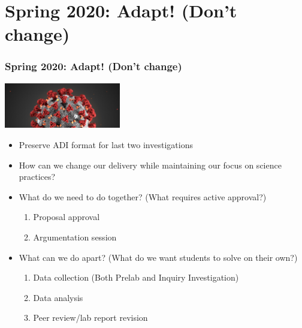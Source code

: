 \documentclass[aspectratio=169,shadow=true]{beamer}
\begin{document}
{\begin{frame}
\begin{center}
  \end{center}
\end{frame}
}

\section{Spring 2020:  Adapt! (Don't change)}
\begin{frame}
  \frametitle{Spring 2020:  Adapt! (Don't change)}
  \begin{center}
    \includegraphics[width=2in]{coronavirus.jpg}
  \end{center}
  \begin{itemize}
    \item<1-> Preserve ADI format for last two investigations
    \item<1-> How can we change our delivery while maintaining our focus on science practices?
    \item<2-> What do we need to do together? (What requires active approval?)
    \begin{enumerate}
      \item Proposal approval
      \item Argumentation session
    \end{enumerate}
    \item<3-> What can we do apart? (What do we want students to solve on their own?)
    \begin{enumerate}
      \item Data collection (Both Prelab and Inquiry Investigation)
      \item Data analysis
      \item Peer review/lab report revision
    \end{enumerate}
  \end{itemize}
\end{frame}
\end{document}
